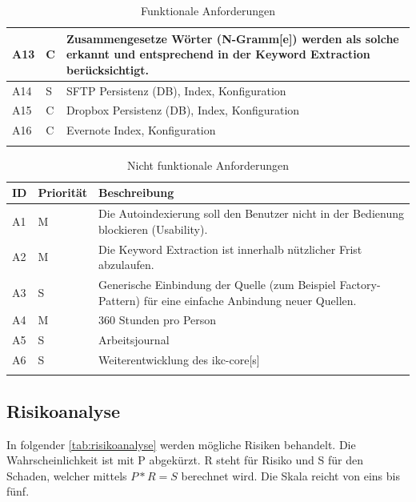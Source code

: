 \begin{longtable}{|p{1.5cm} | p{1.5cm} | p{8.1cm}|}
    A13 & C & Zusammengesetze Wörter (\gls{N-Gramm}[e]) werden als solche erkannt und entsprechend in der \gls{Keyword Extraction} berücksichtigt. \\\hline
    A14 & S & \gls{SFTP} Persistenz (DB), Index, Konfiguration \\\hline
    A15 & C & \gls{Dropbox} Persistenz (DB), Index, Konfiguration \\\hline
    A16 & C & \gls{Evernote} Index, Konfiguration \\\hline
    \caption{Funktionale Anforderungen}
  \label{tab:funktionale-anforderungen}
\end{longtable}

\begin{longtable}{|p{1.5cm} | p{1.5cm} | p{8.1cm}|}
  \hline
    ID & Priorität & Beschreibung \\\hline
    A1 & M & Die Autoindexierung soll den Benutzer nicht in der Bedienung blockieren (Usability).\\\hline
    A2 & M & Die \gls{Keyword Extraction} ist innerhalb nützlicher Frist abzulaufen. \\\hline
    A3 & S & Generische Einbindung der Quelle (zum Beispiel Factory-Pattern) für eine einfache Anbindung neuer Quellen.\\\hline
    A4 & M  & 360 Stunden pro Person\\\hline
    A5 & S & Arbeitsjournal \\\hline
    A6 & S & Weiterentwicklung des \gls{ikc-core}[s] \\\hline
    \caption{Nicht funktionale Anforderungen}
  \label{tab:nicht-funktionale-anforderungen}
\end{longtable}

\subsection{Risikoanalyse}\label{risikoanalyse}

In folgender \autoref{tab:risikoanalyse} werden mögliche Risiken behandelt. Die Wahrscheinlichkeit ist mit P abgekürzt. R steht für Risiko und S für den Schaden, welcher mittels $P*R=S$ berechnet wird. Die Skala reicht von eins bis fünf.

\clearpage

